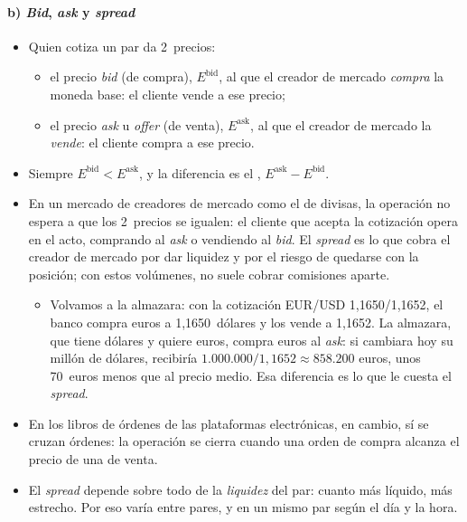 \documentclass[11pt]{article}
\begin{document}
\begin{infografia}[H]
\centering
\caption{Cómo se lee la cotización de un par de divisas}\label{figu:par-divisas}
\end{infografia}

\paragraph{b) \emph{Bid}, \emph{ask} y \emph{spread}}

\begin{itemize}
\item Quien cotiza un par da 2~precios:
  \begin{itemize}
  \item el precio \emph{bid} (de compra), $E^{\mathrm{bid}}$, al que el creador de mercado \emph{compra} la moneda base: el cliente vende a ese precio;
  \item el precio \emph{ask} u \emph{offer} (de venta), $E^{\mathrm{ask}}$, al que el creador de mercado la \emph{vende}: el cliente compra a ese precio.
  \end{itemize}
\item Siempre $E^{\mathrm{bid}}<E^{\mathrm{ask}}$, y la diferencia es el , $E^{\mathrm{ask}}-E^{\mathrm{bid}}$.
\item En un mercado de creadores de mercado como el de divisas, la operación no espera a que los 2~precios se igualen: el cliente que acepta la cotización opera en el acto, comprando al \emph{ask} o vendiendo al \emph{bid}. El \emph{spread} es lo que cobra el creador de mercado por dar liquidez y por el riesgo de quedarse con la posición; con estos volúmenes, no suele cobrar comisiones aparte.
  \begin{itemize}
  \item Volvamos a la almazara: con la cotización EUR/USD 1,1650/1,1652, el banco compra euros a 1,1650~dólares y los vende a 1,1652. La almazara, que tiene dólares y quiere euros, compra euros al \emph{ask}: si cambiara hoy su millón de dólares, recibiría $1.000.000/1{,}1652\approx858.200$ euros, unos 70~euros menos que al precio medio. Esa diferencia es lo que le cuesta el \emph{spread}.
  \end{itemize}
\item En los libros de órdenes de las plataformas electrónicas, en cambio, sí se cruzan órdenes: la operación se cierra cuando una orden de compra alcanza el precio de una de venta.
\item El \emph{spread} depende sobre todo de la \emph{liquidez} del par: cuanto más líquido, más estrecho. Por eso varía entre pares, y en un mismo par según el día y la hora.
\end{itemize}
\end{document}
